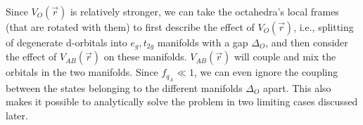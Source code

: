 \documentclass[a4paper,prb,twocolumn]{revtex4-1}  %
\newcommand{\com}[1]{}
\newcommand{\az}[1]{{\color{magenta}{#1}}} %
\begin{document}
Since $V_{O}(\vec r)$ is relatively stronger, 
we can take the octahedra's local frames (that are rotated with them)
to first describe the effect of $V_{O}(\vec r)$, i.e.,
splitting of degenerate d-orbitals into $e_g, t_{2g}$ manifolds with 
a gap $\Delta_O$,
and then
consider the effect of $V_{AB}(\vec r)$ on these manifolds.
$V_{AB}(\vec r)$ will couple and mix the orbitals in the two manifolds.
Since %
$f_{q_A} \ll 1$,
we can even ignore the coupling between the states belonging to the 
different manifolds $\Delta_O$ apart.
This also makes it possible to analytically solve the problem in two limiting cases discussed later.


\com{
The total crystal field potential at the central B atom that we consider
 is given by
\begin{align}
V(\vec r) &= V_O(\vec r) + V_{AB}(\vec r),
\end{align}
where
$V_{AB}(\vec r)=V_{A}(\vec r)+V_{B}(\vec r)$
is due to A and B ion cages.
\az{repetition.... cubic case has similar expressions.... }
}
\end{document}
